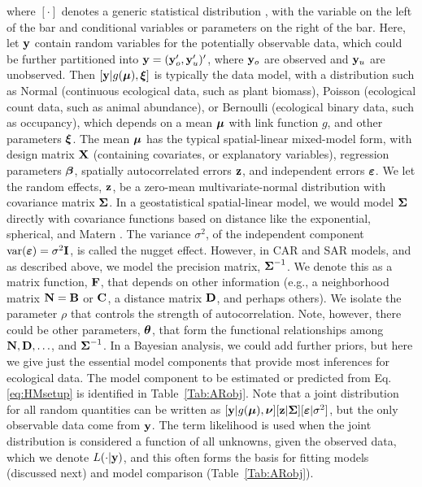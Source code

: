 \documentclass[11pt, titlepage]{article}\usepackage[]{graphicx}\usepackage[]{color}
\begin{document}
\begin{spacing}{1.9}
\begin{flushleft}
where $[\cdot]$ denotes a generic statistical distribution \citep{Gelf:Smit:samp:1990}, with the variable on the left of the bar and conditional variables or parameters on the right of the bar.  Here, let $\mathbf{y}$ contain random variables for the potentially observable data, which could be further partitioned into $\mathbf{y} = (\mathbf{y}_o^{\prime}, \mathbf{y}_u^{\prime})^{\prime}$, where $\mathbf{y}_o$ are observed and $\mathbf{y}_u$ are unobserved.  Then $[\mathbf{y}|g(\mbox{\boldmath $\mu$}), \mbox{\boldmath $\xi$}]$ is typically the data model, with a distribution such as Normal (continuous ecological data, such as plant biomass), Poisson (ecological count data, such as animal abundance), or Bernoulli (ecological binary data, such as occupancy), which depends on a mean $\mbox{\boldmath $\mu$}$ with link function $g$, and other parameters $\mbox{\boldmath $\xi$}$.  The mean $\mbox{\boldmath $\mu$}$ has the typical spatial-linear mixed-model form, with design matrix $\mathbf{X}$ (containing covariates, or explanatory variables), regression parameters ${\boldsymbol{\beta}}$, spatially autocorrelated errors $\mathbf{z}$, and independent errors $\mbox{\boldmath $\varepsilon$}$.  We let the random effects, $\mathbf{z}$, be a zero-mean multivariate-normal distribution with covariance matrix $\mbox{\boldmath $\Sigma$}$.  In a geostatistical spatial-linear model, we would model $\mbox{\boldmath $\Sigma$}$ directly with covariance functions based on distance like the exponential, spherical, and Matern \citep{Chil:Delf:geos:1999}. The variance $\sigma^2$, of the independent component $\textrm{var}(\mbox{\boldmath $\varepsilon$}) = \sigma^2\mathbf{I}$, is called the nugget effect.  However, in CAR and SAR models, and as described above, we model the precision matrix, $\mbox{\boldmath $\Sigma$}^{-1}$.  We denote this as a matrix function, $\mathbf{F}$, that depends on other information (e.g., a neighborhood matrix $\mathbf{N} = \mathbf{B}$ or $\mathbf{C}$, a distance matrix $\mathbf{D}$, and perhaps others). We isolate the parameter $\rho$ that controls the strength of autocorrelation. Note, however, there could be other parameters, $\mbox{\boldmath $\theta$}$, that form the functional relationships among $\mathbf{N}, \mathbf{D}, \ldots$, and $\mbox{\boldmath $\Sigma$}^{-1}$. In a Bayesian analysis, we could add further priors, but here we give just the essential model components that provide most inferences for ecological data.  The model component to be estimated or predicted from Eq. \ref{eq:HMsetup} is identified in Table~\ref{Tab:ARobj}.  Note that a joint distribution for all random quantities can be written as $[\mathbf{y}|g(\mbox{\boldmath $\mu$}),\mbox{\boldmath $\nu$}][\mathbf{z}|\mbox{\boldmath $\Sigma$}][\mbox{\boldmath $\varepsilon$}|\sigma^2]$, but the only observable data come from $\mathbf{y}$. The term likelihood is used when the joint distribution is considered a function of all unknowns, given the observed data, which we denote $L(\cdot|\mathbf{y})$, and this often forms the basis for fitting models (discussed next) and model comparison (Table~\ref{Tab:ARobj}).


\end{flushleft}
\end{spacing}
\end{document}
